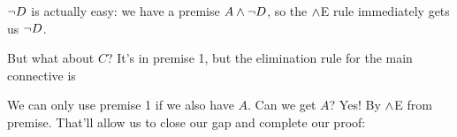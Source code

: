 $\neg D$ is actually easy: we have a premise $A\mathbin{\wedge}\neg D$, so the $\mathbin{\wedge}$E rule immediately gets us $\neg D$. 
\begin{fitchproof}
	 
\end{fitchproof}

But what about $C$? It's in premise 1, but the elimination rule for the main connective is 
\begin{fitchproof}
	 
\end{fitchproof}
We can only use premise 1 if we also have $A$. Can we get $A$? Yes! By $\mathbin{\wedge}$E from premise. That'll allow us to close our gap and complete our proof:
\begin{fitchproof}
	 
\end{fitchproof}
%
%
%
%
%
%
%
%
%
